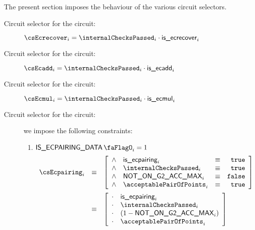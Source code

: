 The present section imposes the behaviour of the various circuit selectors.
\begin{description}
    \item[Circuit selector for the  circuit:]
        $\csEcrecover_{i} = \internalChecksPassed_{i} \cdot \locIsEcrecover_{i}$
    \item[Circuit selector for the  circuit:]
        $\csEcadd_{i} = \internalChecksPassed_{i} \cdot \locIsEcadd_{i}$
    \item[Circuit selector for the  circuit:]
        $\csEcmul_{i} = \internalChecksPassed_{i} \cdot \locIsEcmul_{i}$
    \item[Circuit selector for the  circuit:]
    we impose the following constraints:
        \begin {enumerate}
            \item \If $\isEcpairingData_{i} = 1$ \Then
                \[
                    \begin{array}{lcl}
                        \csEcpairing_{i} & \equiv &
                        \left[ \begin{array}{clcr}
                            \wedge & \locIsEcpairing_{i}         & \equiv & \texttt{true}  \\
                            \wedge & \internalChecksPassed_{i}   & \equiv & \texttt{true}  \\
                            \wedge & \notOnGTwoAccMax_{i}        & \equiv & \texttt{false} \\
                            \wedge & \acceptablePairOfPoints_{i} & \equiv & \texttt{true}  \\
                        \end{array} \right] \vspace{2mm} \\
                        & \equiv & 
                        \left[ \begin{array}{clcr}
                            \cdot & \locIsEcpairing_{i}         \\
                            \cdot & \internalChecksPassed_{i}   \\
                            \cdot & (1 - \notOnGTwoAccMax_{i})  \\
                            \cdot & \acceptablePairOfPoints_{i} \\
                        \end{array} \right] \vspace{2mm} \\

\end{array}\]
\end{enumerate}
\end{description}
